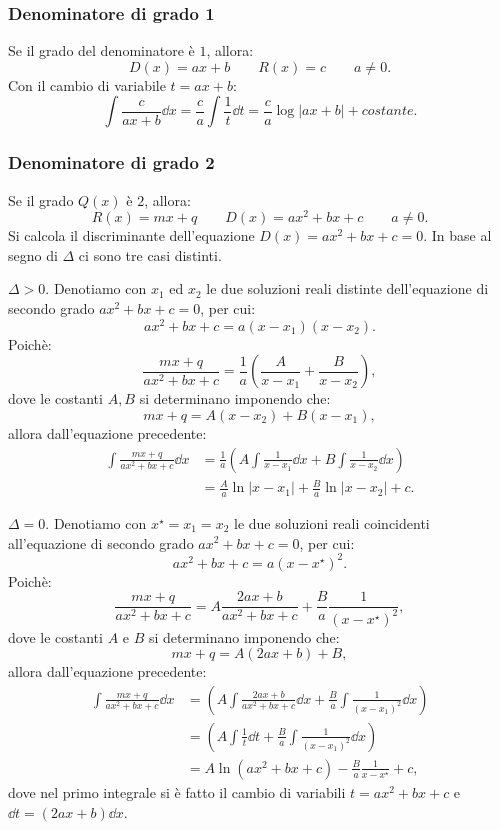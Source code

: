 \subsubsection{Denominatore di grado 1}
Se il grado del denominatore è $1$, allora:
\[D(x)=ax+b \qquad R(x)=c \qquad a\neq0.\]
Con il cambio di variabile $t=ax+b$:
\[\int\frac{c}{ax+b}\dd x = \frac{c}{a}\int\frac{1}{t}\dd t = \frac{c}{a}\log|ax+b|+costante.\]

\subsubsection{Denominatore di grado 2}
Se il grado $Q(x)$ è $2$, allora:
\[R(x)=mx+q \qquad D(x)=ax^2+bx+c \qquad a\neq0.\]
Si calcola il discriminante dell'equazione $D(x)=ax^2+bx+c=0$. In base al segno di $\Delta$ ci sono tre casi distinti.
\begin{aenumerate}
\item $\Delta>0$. Denotiamo con $x_1$ ed $x_2$ le due soluzioni reali distinte dell'equazione di secondo grado $ax^2+bx+c=0$, per cui:
\[ax^2+bx+c=a(x-x_1)(x-x_2).\]
Poichè:
\[\frac{mx+q}{ax^2+bx+c}=\frac{1}{a}\left(\frac{A}{x-x_1}+\frac{B}{x-x_2}\right),\]
dove le costanti $A,B$ si determinano imponendo che:
\[mx+q=A(x-x_2)+B(x-x_1),\]
allora dall'equazione precedente:
\begin{equation}
\begin{split}
\int\frac{mx+q}{ax^2+bx+c}\dd x & = \frac{1}{a}\left(A\int\frac{1}{x-x_1}\dd x+B\int\frac{1}{x-x_2}\dd x\right) \\
& = \frac{A}{a}\ln|x-x_1|+\frac{B}{a}\ln|x-x_2|+c.
\end{split}
\end{equation}

\item $\Delta=0$. Denotiamo con $x^\star=x_1=x_2$ le due soluzioni reali coincidenti all'equazione di secondo grado $ax^2+bx+c=0$, per cui:
\[ax^2+bx+c=a(x-x^\star)^2.\]
Poichè:
\[\frac{mx+q}{ax^2+bx+c}=A\frac{2ax+b}{ax^2+bx+c}+\frac{B}{a}\frac{1}{(x-x^\star)^2},\]
dove le costanti $A$ e $B$ si determinano imponendo che:
\[mx+q=A(2ax+b)+B,\]
allora dall'equazione precedente:
\begin{equation}
\begin{split}
\int\frac{mx+q}{ax^2+bx+c}\dd x & = \left(A\int\frac{2ax+b}{ax^2+bx+c}\dd x+\frac{B}{a}\int\frac{1}{(x-x_1)^2}\dd x\right) \\
& = \left(A\int\frac{1}{t}\dd t+\frac{B}{a}\int\frac{1}{(x-x_1)^2}\dd x\right) \\
& = A\ln(ax^2+bx+c)-\frac{B}{a}\frac{1}{x-x^\star}+c,
\end{split}
\end{equation}
dove nel primo integrale si è fatto il cambio di variabili $t=ax^2+bx+c$ e $\dd t=(2ax+b)\dd x$.


\end{aenumerate}
